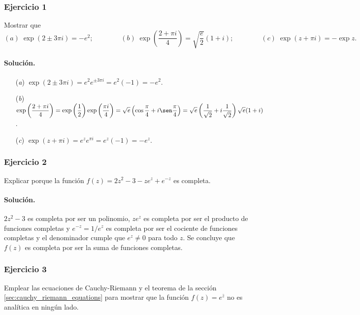 \documentclass[a4paper]{report}
\begin{document}
\subsubsection{Ejercicio 1}

Mostrar que 
\[
 (\textit{a})\;\exp(2\pm3\pi i)=-e^2;\qquad\qquad 
 (\textit{b})\;\exp\left(\frac{2+\pi i}{4}\right)=\sqrt{\frac{e}{2}}(1+i);\qquad\qquad
 (\textit{c})\;\exp(z+\pi i)=-\exp z.
\]

\paragraph{Solución.} 

\begin{enumerate}
 \item[(\textit{a})] \(\exp(2\pm3\pi i)=e^2e^{\pm3\pi i}=e^2(-1)=-e^2\).
 \item[(\textit{b})] \(\displaystyle\exp\left(\frac{2+\pi i}{4}\right)=\exp\left(\frac{1}{2}\right)\exp\left(\frac{\pi i}{4}\right)=\sqrt{e}\left(\cos\frac{\pi}{4}+i\sen\frac{\pi}{4}\right)=\sqrt{e}\left(\frac{1}{\sqrt{2}}+i\frac{1}{\sqrt{2}}\right)\sqrt{e}(1+i)\).
 \item[(\textit{c})] \(\exp(z+\pi i)=e^ze^{\pi i}=e^z(-1)=-e^z\).
\end{enumerate}

\subsubsection{Ejercicio 2}

Explicar porque la función \(f(z)=2z^2-3-ze^z+e^{-z}\) es completa.

\paragraph{Solución.} \(2z^2-3\) es completa por ser un polinomio, \(ze^z\) es completa por ser el producto de funciones completas y \(e^{-z}=1/e^z\) es completa por ser el cociente de funciones completas y el denominador cumple que \(e^z\neq 0\) para todo \(z\). Se concluye que \(f(z)\) es completa por ser la suma de funciones completas.

\subsubsection{Ejercicio 3}

Emplear las ecuaciones de Cauchy-Riemann y el teorema de la sección \ref{sec:cauchy_riemann_equations} para mostrar que la función \(f(z)=e^{\overline{z}}\) no es analítica en ningún lado.
\end{document}
